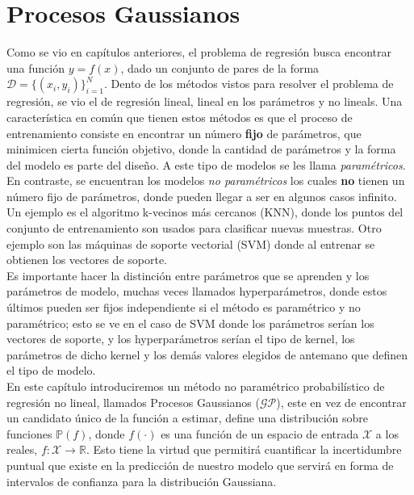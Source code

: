 

\newcommand{\gp}{\ensuremath{\mathcal{GP}}}
\newcommand{\pr}{\ensuremath{\mathbb{P}}}
\newcommand{\x}{\ensuremath{\mathbf{x}}}
\newcommand{\y}{\ensuremath{\mathbf{y}}}
\newcommand{\bx}{\ensuremath{\textcolor{blue}{X}}}
\newcommand{\by}{\ensuremath{\textcolor{blue}{Y}}}
\newcommand{\rx}{\ensuremath{\textcolor{red}{X_*}}}


\newpage
\section{Procesos Gaussianos}


Como se vio en capítulos anteriores, el problema de regresión busca encontrar una función $y= f(x)$, dado un conjunto de pares de la forma $\mathcal{D}=\{(x_i, y_i)\}_{i=1}^N$. Dento de los métodos vistos para resolver el problema de regresión, se vio el de regresión lineal, lineal en los parámetros y no lineals. Una característica en común que tienen estos métodos es que el proceso de entrenamiento consiste en encontrar un número \textbf{fijo} de parámetros, que minimicen cierta función objetivo, donde la cantidad de parámetros y la forma del modelo es parte del diseño. A este tipo de modelos se les llama \textit{paramétricos}.\\

En contraste, se encuentran los modelos \textit{no paramétricos} los cuales \textbf{no} tienen un número fijo de parámetros, donde pueden llegar a ser en algunos casos infinito. Un ejemplo es el algoritmo k-vecinos más cercanos (KNN), donde los puntos del conjunto de entrenamiento son usados para clasificar nuevas muestras. Otro ejemplo son las máquinas de soporte vectorial (SVM) donde al entrenar se obtienen los vectores de soporte.\\

Es importante hacer la distinción entre parámetros que se aprenden y los parámetros de modelo, muchas veces llamados hyperparámetros, donde estos últimos pueden ser fijos independiente si el método es paramétrico y no paramétrico; esto se ve en el caso de SVM donde los parámetros serían los vectores de soporte, y los hyperparámetros serían el tipo de kernel, los parámetros de dicho kernel y los demás valores elegidos de antemano que definen el tipo de modelo.\\

En este capítulo introduciremos un método no paramétrico probabilístico de regresión no lineal, llamados Procesos Gaussianos ($\gp$), este en vez de encontrar un candidato único de la función a estimar, define una distribución sobre funciones $\mathbb{P}(f)$, donde $f(\cdot)$ es una función de un espacio de entrada $\mathcal{X}$ a los reales, $f: \mathcal{X} \rightarrow \mathbb{R}$. Esto tiene la virtud que permitirá cuantificar la incertidumbre puntual que existe en la predicción de nuestro modelo que servirá en forma de intervalos de confianza para la distribución Gaussiana.\\

